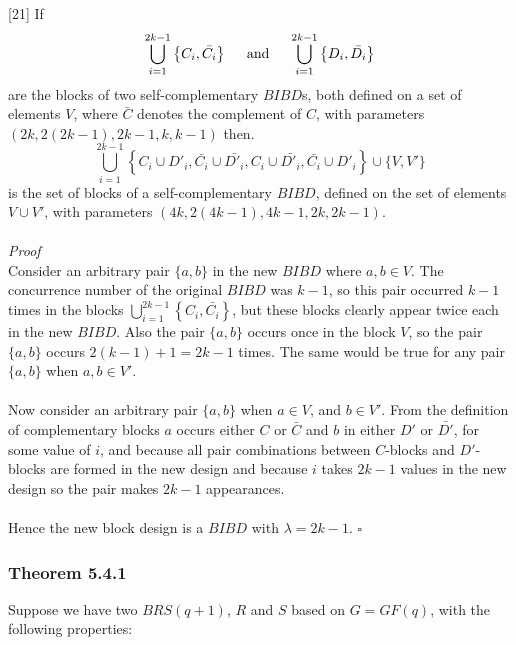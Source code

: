 \documentclass[
  11pt,
  a4paper]{book}
\begin{document}
{[}21{]} If
\[\bigcup\limits_{i=1}^{2k-1} \left \{C_i,\bar{C_i} \right \} \hspace{0.5cm} \mathrm{and} \hspace{0.5cm} 
\bigcup\limits_{i=1}^{2k-1} \left \{D_i,\bar{D_i} \right \}\] are the
blocks of two self-complementary \(BIBD\)s, both defined on a set of
elements \(V\), where \(\bar{C}\) denotes the complement of \(C\), with
parameters \((2k,2(2k-1),2k-1,k,k-1)\) then.
\[\bigcup\limits_{i=1}^{2k-1} \left \{C_i \cup D'_i, \bar{C_i} \cup \bar{D'_i}, C_i \cup \bar{D'_i},
\bar{C_i} \cup D'_i  \right \} \cup \{V,V'\}\] is the set of blocks of a
self-complementary \(BIBD\), defined on the set of elements \(V \cup V'\),
with parameters \((4k,2(4k-1),4k-1,2k,2k-1)\).\\
~\\
\emph{Proof}\\
Consider an arbitrary pair \(\{a,b\}\) in the new \(BIBD\) where
\(a,b \in V\). The concurrence number of the original \(BIBD\) was \(k-1\), so
this pair occurred \(k-1\) times in the blocks
\(\bigcup\limits_{i=1}^{2k-1} \left \{C_i,\bar{C_i} \right \}\), but these
blocks clearly appear twice each in the new \(BIBD\). Also the pair
\(\{a,b\}\) occurs once in the block \(V\), so the pair \(\{a,b\}\) occurs
\(2(k-1)+1 = 2k-1\) times. The same would be true for any pair \(\{a,b\}\)
when \(a,b \in V'\).\\
~\\
Now consider an arbitrary pair \(\{a,b\}\) when \(a \in V\), and \(b \in V'\).
From the definition of complementary blocks \(a\) occurs either \(C\) or
\(\bar{C}\) and \(b\) in either \(D'\) or \(\bar{D'}\), for some value of \(i\),
and because all pair combinations between \(C\)-blocks and \(D'\)-blocks are
formed in the new design and because \(i\) takes \(2k-1\) values in the new
design so the pair makes \(2k-1\) appearances.\\
~\\
Hence the new block design is a \(BIBD\) with \(\lambda =2k-1\). \(\square\)

\hypertarget{theorem-5.4.1}{%
\subsubsection{Theorem 5.4.1}\label{theorem-5.4.1}}

Suppose we have two \(BRS(q+1)\), \(R\) and \(S\) based on \(G = GF(q)\), with
the following properties:
\end{document}
